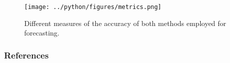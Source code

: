 \documentclass[11pt, aspectratio=169]{beamer}
\begin{document}
\begin{frame}[t]
    \begin{figure}[H]

        \centering
        \texttt{[image: ../python/figures/metrics.png]}

        \caption{Different measures of the accuracy of both methods employed for forecasting.}
        \label{fig:measures}

    \end{figure}
\end{frame}

\begin{frame}[t]
    
\end{frame}





\begin{frame}[allowframebreaks]
    \frametitle{References}
    \renewcommand{\bibfont}{\normalfont\footnotesize}
    \printbibliography
\end{frame}
\end{document}
